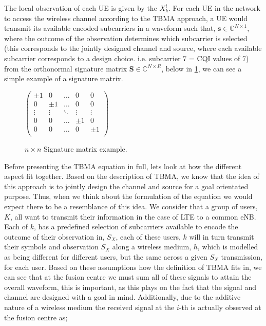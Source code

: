 \documentclass{article}
\begin{document}


The local observation of each UE is given by the $X^i_k$. For each UE in the network to access the wireless channel according to the TBMA approach, a UE would transmit its available encoded subcarriers in a waveform such that, $\boldsymbol{s} \in \mathbb{C}^{N \times 1}$, where the outcome of the observation determines which subcarrier is selected (this corresponds to the jointly designed channel and source, where each available subcarrier corresponds to a design choice. i.e. subcarrier 7 =  CQI values of 7) from the orthonormal signature matrix $\boldsymbol{S} \in \mathbb{C}^{N \times R}$, below in \cref{fig:sig_mat}, we can see a simple example of a signature matrix.

\begin{figure}[ht]
\centering
    $\begin{pmatrix}
\pm1 & 0 & \hdots & 0 & 0\\
0 & \pm1 & \hdots & 0 & 0 \\
\vdots & \vdots & \ddots & \vdots & \vdots \\
0 & 0 & \hdots & \pm1 & 0 \\
0 & 0 & \hdots & 0 & \pm1 \\
\end{pmatrix}$
\caption{$n \times n$ Signature matrix example.}
\label{fig:sig_mat}
\end{figure}

Before presenting the TBMA equation in full, lets look at how the different aspect fit together. Based on the description of TBMA, we know that the idea of this approach is to jointly design the channel and source for a goal orientated purpose. Thus, when we think about the formulation of the equation we would expect there to be a resemblance of this idea.  We consider that a group of users, $K$, all want to transmit their information in the case of LTE to a common eNB. Each of $k$, has a predefined selection of subcarriers available to encode the outcome of their observation in, $S_X$, each of these users, $k$ will in turn transmit their symbols and observation $S_X$ along a wireless medium, $h$, which is modelled as being different for different users, but the same across a given $S_X$ transmission, for each user. Based on these assumptions how the definition of TBMA fits in, we can see that at the fusion centre we must sum all of these signals to attain the overall waveform, this is important, as this plays on the fact that the signal and channel are designed with a goal in mind. Additionally, due to the additive nature of a wireless medium the received signal at the $i$-th is actually observed at the fusion centre as;
\end{document}
